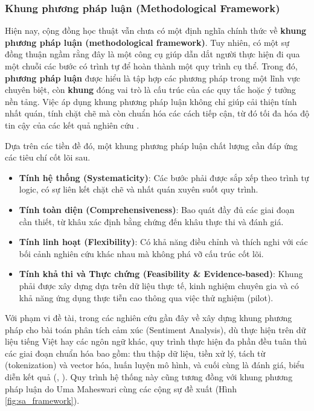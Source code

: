 \documentclass{article}[12pt]
\begin{document}
{    \subsubsection{Khung phương pháp luận (Methodological Framework)}
    Hiện nay, cộng đồng học thuật vẫn chưa có một định nghĩa chính thức về \textbf{khung phương pháp luận (methodological framework)}. Tuy nhiên, có một sự đồng thuận ngầm rằng đây là một công cụ giúp dẫn dắt người thực hiện đi qua một chuỗi các bước có trình tự để hoàn thành một quy trình cụ thể. Trong đó, \textbf{phương pháp luận} được hiểu là tập hợp các phương pháp trong một lĩnh vực chuyên biệt, còn \textbf{khung} đóng vai trò là cấu trúc của các quy tắc hoặc ý tưởng nền tảng. Việc áp dụng khung phương pháp luận không chỉ giúp cải thiện tính nhất quán, tính chặt chẽ mà còn chuẩn hóa các cách tiếp cận, từ đó tối đa hóa độ tin cậy của các kết quả nghiên cứu \cite{mcmeekin2020methodological}.

    Dựa trên các tiền đề đó, một khung phương pháp luận chất lượng cần đáp ứng các tiêu chí cốt lõi sau.

    \begin{itemize}
        \item \textbf{Tính hệ thống (Systematicity)}: Các bước phải được sắp xếp theo trình tự logic, có sự liên kết chặt chẽ và nhất quán xuyên suốt quy trình.
        \item \textbf{Tính toàn diện (Comprehensiveness)}: Bao quát đầy đủ các giai đoạn cần thiết, từ khâu xác định bằng chứng đến khâu thực thi và đánh giá.
        \item \textbf{Tính linh hoạt (Flexibility)}: Có khả năng điều chỉnh và thích nghi với các bối cảnh nghiên cứu khác nhau mà không phá vỡ cấu trúc cốt lõi.
        \item \textbf{Tính khả thi và Thực chứng (Feasibility \& Evidence-based)}: Khung phải được xây dựng dựa trên dữ liệu thực tế, kinh nghiệm chuyên gia và có khả năng ứng dụng thực tiễn cao thông qua việc thử nghiệm (pilot).
    \end{itemize}

    Với phạm vi đề tài, trong các nghiên cứu gần đây về xây dựng khung phương pháp cho bài toán phân tích cảm xúc (Sentiment Analysis), dù thực hiện trên dữ liệu tiếng Việt hay các ngôn ngữ khác, quy trình thực hiện đa phần đều tuân thủ các giai đoạn chuẩn hóa bao gồm: thu thập dữ liệu, tiền xử lý, tách từ (tokenization) và vector hóa, huấn luyện mô hình, và cuối cùng là đánh giá, biểu diễn kết quả (\cite{el2025transformer}, \cite{singh2021youtube}). Quy trình hệ thống này cũng tương đồng với khung phương pháp luận do Uma Maheswari cùng các cộng sự đề xuất (Hình \ref{fig:sa_framework}).

}
\end{document}
